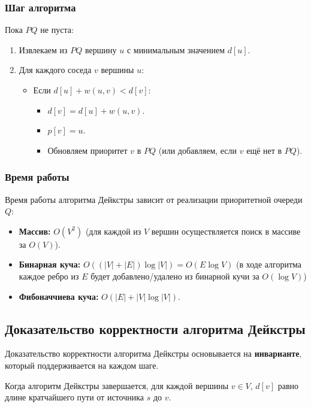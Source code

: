 \subsubsection{Шаг алгоритма}
Пока $PQ$ не пуста:
\begin{enumerate}
	\item Извлекаем из $PQ$ вершину $u$ с минимальным значением $d[u]$.
	\item Для каждого соседа $v$ вершины $u$:
	\begin{itemize}
		\item Если $d[u] + w(u,v) < d[v]$:
		\begin{itemize}
			\item $d[v] = d[u] + w(u,v)$.
			\item $p[v] = u$.
			\item Обновляем приоритет $v$ в $PQ$ (или добавляем, если $v$ ещё нет в $PQ$).
		\end{itemize}
	\end{itemize}
\end{enumerate}

\subsubsection{Время работы}
Время работы алгоритма Дейкстры зависит от реализации приоритетной очереди $Q$:
\begin{itemize}
	\item \textbf{Массив:} $O(V^2)$ (для каждой из $V$ вершин осуществляется поиск в массиве за $O(V)$).
	\item \textbf{Бинарная куча:} $O((|V| + |E|) \log |V|) = O(E \log V)$ (в ходе алгоритма каждое ребро из $E$ будет добавлено/удалено из бинарной кучи за $O(\log V)$)
	\item \textbf{Фибоначчиева куча:} $O(|E| + |V| \log |V|)$.
\end{itemize}

\subsection{Доказательство корректности алгоритма Дейкстры}

Доказательство корректности алгоритма Дейкстры основывается на \textbf{инварианте}, который поддерживается на каждом шаге.

\begin{theorem}
	Когда алгоритм Дейкстры завершается, для каждой вершины $v \in V$, $d[v]$ равно длине кратчайшего пути от источника $s$ до $v$.
\end{theorem}

